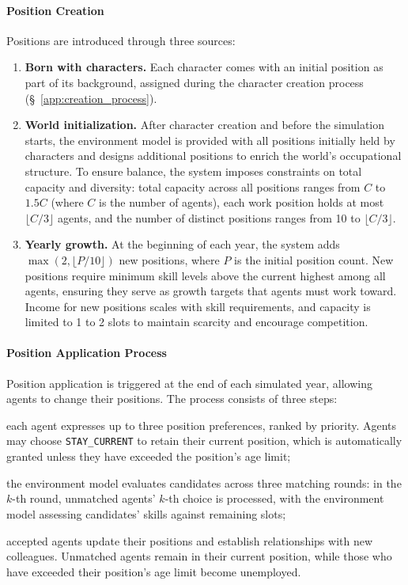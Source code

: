 \paragraph{Position Creation}
Positions are introduced through three sources:
\begin{enumerate}[nosep]
\item \textbf{Born with characters.} Each character comes with an initial position as part of its background, assigned during the character creation process (\S~\ref{app:creation_process}).
\item \textbf{World initialization.} After character creation and before the simulation starts, the environment model is provided with all positions initially held by characters and designs additional positions to enrich the world's occupational structure.
To ensure balance, the system imposes constraints on total capacity and diversity: total capacity across all positions ranges from $C$ to $1.5C$ (where $C$ is the number of agents), each work position holds at most $\lfloor C/3 \rfloor$ agents, and the number of distinct positions ranges from 10 to $\lfloor C/3 \rfloor$.
\item \textbf{Yearly growth.} At the beginning of each year, the system adds $\max(2, \lfloor P/10 \rfloor)$ new positions, where $P$ is the initial position count.
New positions require minimum skill levels above the current highest among all agents, ensuring they serve as growth targets that agents must work toward.
Income for new positions scales with skill requirements, and capacity is limited to 1 to 2 slots to maintain scarcity and encourage competition.
\end{enumerate}

\paragraph{Position Application Process}
Position application is triggered at the end of each simulated year, allowing agents to change their positions.
The process consists of three steps:
\begin{inparaenum}[\it (1)]
\item each agent expresses up to three position preferences, ranked by priority.
Agents may choose \texttt{STAY\_CURRENT} to retain their current position, which is automatically granted unless they have exceeded the position's age limit;
\item the environment model evaluates candidates across three matching rounds: in the $k$-th round, unmatched agents' $k$-th choice is processed, with the environment model assessing candidates' skills against remaining slots;
\item accepted agents update their positions and establish relationships with new colleagues. Unmatched agents remain in their current position, while those who have exceeded their position's age limit become unemployed.
\end{inparaenum}

